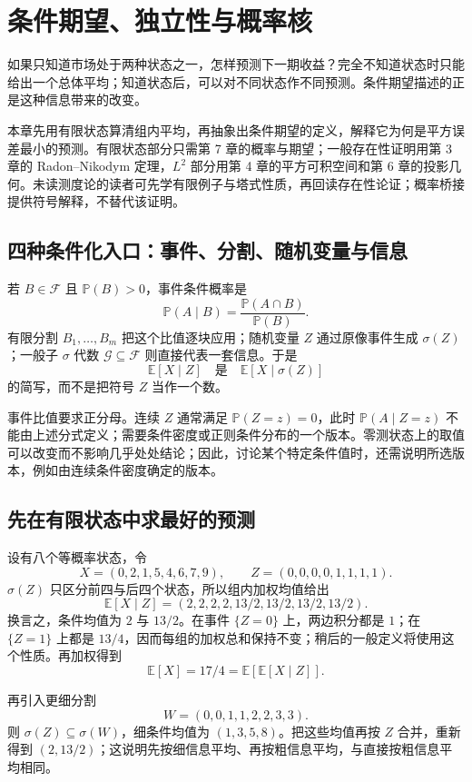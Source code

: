 \chapter{条件期望、独立性与概率核}
\label{ch:conditioning}


如果只知道市场处于两种状态之一，怎样预测下一期收益？完全不知道状态时只能给出一个总体平均；知道状态后，可以对不同状态作不同预测。条件期望描述的正是这种信息带来的改变。

本章先用有限状态算清组内平均，再抽象出条件期望的定义，解释它为何是平方误差最小的预测。有限状态部分只需第 7 章的概率与期望；一般存在性证明用第 3 章的 Radon--Nikodym 定理，$L^2$ 部分用第 4 章的平方可积空间和第 6 章的投影几何。未读测度论的读者可先学有限例子与塔式性质，再回读存在性论证；概率桥接提供符号解释，不替代该证明。

\section{四种条件化入口：事件、分割、随机变量与信息}

若 $B\in\mathcal F$ 且 $\mathbb P(B)>0$，事件条件概率是
\[
  \mathbb P(A\mid B)=\frac{\mathbb P(A\cap B)}{\mathbb P(B)}.
\]
有限分割 $B_1,\ldots,B_m$ 把这个比值逐块应用；随机变量 $Z$ 通过原像事件生成
$\sigma(Z)$；一般子 $\sigma$ 代数 $\mathcal G\subseteq\mathcal F$ 则直接代表一套信息。于是
\[
  \mathbb E[X\mid Z]
  \quad\text{是}\quad
  \mathbb E[X\mid\sigma(Z)]
\]
的简写，而不是把符号 $Z$ 当作一个数。

事件比值要求正分母。连续 $Z$ 通常满足 $\mathbb P(Z=z)=0$，此时
$\mathbb P(A\mid Z=z)$ 不能由上述分式定义；需要条件密度或正则条件分布的一个版本。零测状态上的取值可以改变而不影响几乎处处结论；因此，讨论某个特定条件值时，还需说明所选版本，例如由连续条件密度确定的版本。

\section{先在有限状态中求最好的预测}

设有八个等概率状态，令
\[
 X=(0,2,1,5,4,6,7,9),
 \qquad Z=(0,0,0,0,1,1,1,1).
\]
$\sigma(Z)$ 只区分前四与后四个状态，所以组内加权均值给出
\[
  \mathbb E[X\mid Z]
  =(2,2,2,2,13/2,13/2,13/2,13/2).
\]
换言之，条件均值为 $2$ 与 $13/2$。在事件 $\{Z=0\}$ 上，两边积分都是
$1$；在 $\{Z=1\}$ 上都是 $13/4$，因而每组的加权总和保持不变；稍后的一般定义将使用这个性质。再加权得到
\[
  \mathbb E[X]=17/4
  =\mathbb E\!\left[\mathbb E[X\mid Z]\right].
\]

再引入更细分割
\[
  W=(0,0,1,1,2,2,3,3).
\]
则 $\sigma(Z)\subseteq\sigma(W)$，细条件均值为 $(1,3,5,8)$。把这些均值再按 $Z$ 合并，重新得到 $(2,13/2)$；这说明先按细信息平均、再按粗信息平均，与直接按粗信息平均相同。

